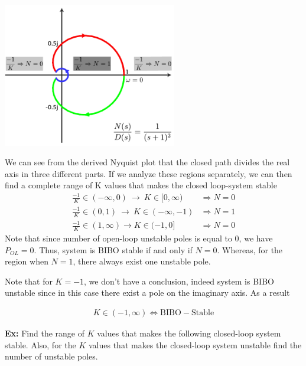 \documentclass[twoside]{article}
\begin{document}
  \begin{minipage}[h]{1\linewidth}
    \begin{center}
      \includegraphics[width=0.57\textwidth]{ex2}
    \end{center}
  \end{minipage}

\vspace{6 pt}

We can see from the derived Nyquist plot that the closed
path divides the real axis in three different parts. If we analyze 
these regions separately, we can then find a complete range of
K values that makes the closed loop-system stable
%
\begin{align*}
  \frac{-1}{K} \in (-\infty ,  0) \ \rightarrow \ K \in [0 , \infty) &\Rightarrow N = 0
  \\
   \frac{-1}{K} \in (0,1)  \ \rightarrow \ K \in (-\infty , -1)  &\Rightarrow N = 1
  \\
  \frac{-1}{K} \in (1,\infty) \rightarrow K \in (-1 , 0] &\Rightarrow N = 0
\end{align*}
%
Note that since number of open-loop unstable poles is equal to 0, 
we have $P_{OL} = 0$. Thus, system is BIBO stable if and only if $N = 0$.
Whereas, for the region when $N = 1$, there always exist one unstable pole. 

Note that for $K = -1$, we don't have a conclusion, indeed system 
is BIBO unstable since in this case there exist a pole on the
imaginary axis. As a result 

\begin{align*}
  K \in (-1 , \infty) \Leftrightarrow \mathrm{BIBO-Stable}
\end{align*}

\newpage

\textbf{Ex:} Find the range of $K$ values that makes the
following closed-loop system stable. Also, for the $K$ values that 
makes the closed-loop system unstable find the number of unstable poles.
\end{document}
